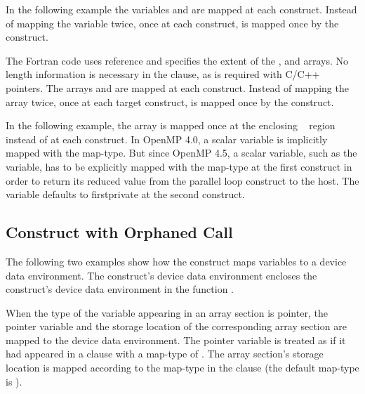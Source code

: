 In the following example the variables  and  are mapped at each  
construct. Instead of mapping the variable  twice, once at each  
construct,  is mapped once by the   construct.



The Fortran code uses reference and specifies the extent of the ,  and  arrays. 
No length information is necessary in the  clause, as is required with 
C/C++ pointers. The arrays  and  are mapped at each  construct. 
Instead of mapping the array  twice, once at each target construct,  is mapped 
once by the   construct.


In the following example, the array  is mapped once at the enclosing 
~ region instead of at each  construct. 
In OpenMP 4.0, a scalar variable is implicitly mapped with the  map-type.
But since OpenMP 4.5, a scalar variable, such as the  variable, has to be explicitly mapped with 
the  map-type at the first  construct in order to return 
its reduced value from the parallel loop construct to the host.
The variable defaults to firstprivate at the second  construct.



\subsection{  Construct with Orphaned Call}

The following two examples show how the   construct 
maps variables to a device data environment. The   
construct's device data environment encloses the  construct's device 
data environment in the function .

When the type of the variable appearing in an array section is pointer, the pointer 
variable and the storage location of the corresponding array section are mapped 
to the device data environment. The pointer variable is treated as if it had appeared 
in a  clause with a map-type of . The array section's 
storage location is mapped according to the map-type in the  clause 
(the default map-type is ).

